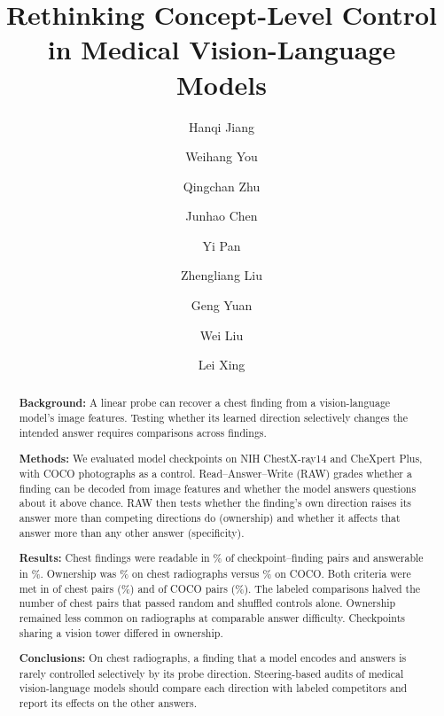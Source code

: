 \documentclass[a4paper,fleqn]{cas-dc}
\begin{document}
\let\WriteBookmarks\relax
\def\floatpagepagefraction{1}
\def\textpagefraction{.001}


\title [mode = title]{Rethinking Concept-Level Control in Medical Vision-Language Models}

\author[1,2]{Hanqi Jiang}
\fnmark[1]
\author[1]{Weihang You}
\fnmark[1]
\author[1]{Qingchan Zhu}
\author[1]{Junhao Chen}
\author[1]{Yi Pan}
\author[1]{Zhengliang Liu}
\author[1]{Geng Yuan}
\author[3]{Wei Liu}
\author[2]{Lei Xing}
\cormark[1]



\begin{abstract}
\textbf{Background:} A linear probe can recover a chest finding from a vision-language model's image features. Testing whether its learned direction selectively changes the intended answer requires comparisons across findings.

\textbf{Methods:} We evaluated \cfCheckpoints{} model checkpoints on NIH ChestX-ray14 and CheXpert Plus, with COCO photographs as a control. Read--Answer--Write (RAW) grades whether a finding can be decoded from image features and whether the model answers questions about it above chance. RAW then tests whether the finding's own direction raises its answer more than competing directions do (ownership) and whether it affects that answer more than any other answer (specificity).

\textbf{Results:} Chest findings were readable in \cfChestReadablePct{}\% of checkpoint--finding pairs and answerable in \cfChestAnswerablePct{}\%. Ownership was \cfChestOwnedPct{}\% on chest radiographs versus \cfCocoOwnedPct{}\% on COCO. Both criteria were met in \jnTwoWayChest{} of \cfChestCellsN{} chest pairs (\jnTwoWayChestPct{}\%) and \jnTwoWayCoco{} of \cfCocoCells{} COCO pairs (\jnTwoWayCocoPct{}\%). The labeled comparisons halved the number of chest pairs that passed random and shuffled controls alone. Ownership remained less common on radiographs at comparable answer difficulty. Checkpoints sharing a vision tower differed in ownership.

\textbf{Conclusions:} On chest radiographs, a finding that a model encodes and answers is rarely controlled selectively by its probe direction. Steering-based audits of medical vision-language models should compare each direction with labeled competitors and report its effects on the other answers.
\end{abstract}
\end{document}
